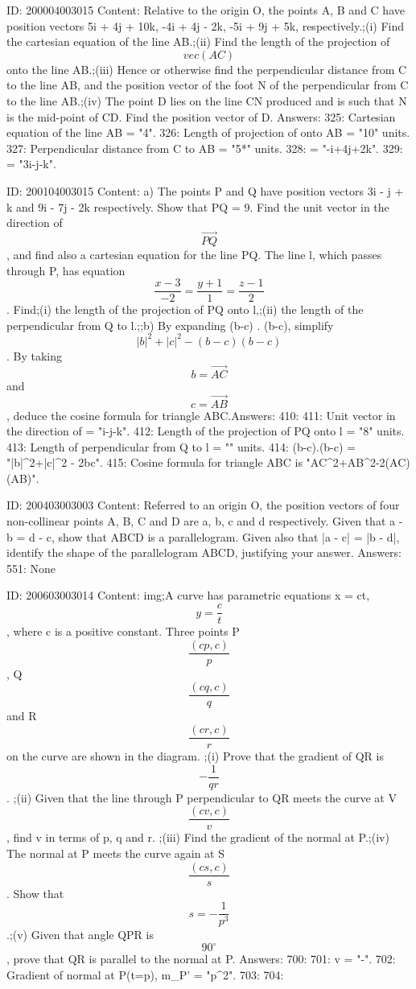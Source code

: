\documentclass{article}
\begin{document}
ID: 200004003015
Content:
Relative to the origin O, the points A, B and C have position vectors 5i + 4j + 10k, -4i + 4j - 2k, -5i + 9j + 5k, respectively.;(i) Find the cartesian equation of the line AB.;(ii) Find the length of the projection of  $$vec(AC) $$ onto the line AB.;(iii) Hence or otherwise find the perpendicular distance from C to the line AB, and the position vector of the foot N of the perpendicular from C to the line AB.;(iv) The point D lies on the line CN produced and is such that N is the mid-point of CD. Find the position vector of D. Answers:
325: Cartesian equation of the line AB = "4".
326: Length of projection of  onto AB = "10" units.
327: Perpendicular distance from C to AB = "5*" units.
328:  = "-i+4j+2k".
329:  = "3i-j-k".

ID: 200104003015
Content:
a)  The points P and Q have position vectors 3i - j + k and 9i - 7j - 2k respectively. Show that PQ = 9. Find the unit vector in the direction of  $$\vec{PQ}$$, and find also a cartesian equation for the line PQ. The line l, which passes through P, has equation  $$\frac{x - 3}{- 2} = \frac{y + 1}{1} = \frac{z - 1}{2}$$. Find;(i) the length of the projection of PQ onto l,;(ii) the length of the perpendicular from Q to l.;;b) By expanding (b-c) . (b-c), simplify  $$| b |^2  + | c |^2  -  (b-c)( b-c)$$. By taking  $$b = \vec{AC}$$ and  $$c = \vec{AB}$$, deduce the cosine formula for triangle ABC.Answers:
410: 
411: Unit vector in the direction of  = "i-j-k".
412: Length of the projection of PQ onto l = "8" units.
413:  Length of perpendicular from Q to l = "" units.
414: (b-c).(b-c) = "|b|^2+|c|^2 - 2bc".
415: Cosine formula for triangle ABC is "AC^2+AB^2-2(AC)(AB)".

ID: 200403003003
Content:
Referred to an origin O, the position vectors of four non-collinear points A, B, C and D are a, b, c and d respectively. Given that a - b = d - c, show that ABCD is a parallelogram. Given also that |a - c| = |b - d|, identify the shape of the parallelogram ABCD, justifying your answer.  Answers:
551: None

ID: 200603003014
Content:
img;A curve has parametric equations x = ct, $$y=\frac{c}{t} $$, where c is a positive constant. Three points P $$\frac{(cp,c)}{p}$$, Q $$\frac{(cq,c)}{q}$$ and R $$\frac{(cr,c)}{r}$$ on the curve are shown in the diagram. ;(i) Prove that the gradient of QR is $$- \frac{1}{qr} $$.  ;(ii) Given that the line through P perpendicular to QR meets the curve at V $$\frac{(cv,c)}{v}$$ , find v in terms of p, q and r. ;(iii) Find the gradient of the normal at P.;(iv) The normal at P meets the curve again at S $$\frac{(cs,c)}{s}$$. Show that $$s= - \frac{1}{p^{3}} $$.;(v) Given that angle QPR is $$90^{\circ}$$, prove that QR is parallel to the normal at P.  Answers:
700: 
701: v = "-".
702: Gradient of normal at  P(t=p), m_P' = "p^2".
703: 
704: 
\end{document}
